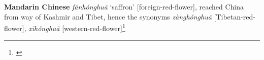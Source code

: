 \begin{etymology}\label{ety:fanhonghua}
\textbf{Mandarin Chinese}  \textit{fānhónghuā} `saffron' [foreign-red-flower], reached China from way of Kashmir and Tibet, hence the synonyms  \textit{zànghónghuā} [Tibetan-red-flower],  \textit{xīhónghuā} [western-red-flower]\footnote{\textcite{kleeman_oxford_2010}}
\end{etymology}